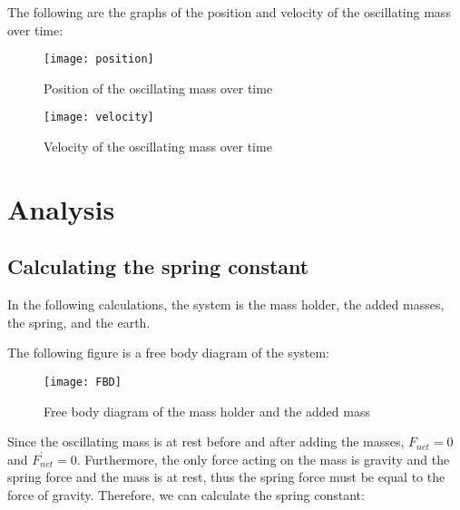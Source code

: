 \documentclass[titlepage]{article}
\begin{document}
            The following are the graphs of the position and velocity of the oscillating mass over time:
            
            \begin{minipage}{.5\textwidth}
                \begin{figure}[H]
                    \centering
                    \texttt{[image: position]}
                    \caption{Position of the oscillating mass over time}
                    \label{fig:position}
                \end{figure}
            \end{minipage}%
            \begin{minipage}{.5\textwidth}
                \begin{figure}[H]
                    \centering
                    \texttt{[image: velocity]}
                    \caption{Velocity of the oscillating mass over time}
                    \label{fig:velocity}
                \end{figure}
            \end{minipage}
    
    
    \section{Analysis}\label{sec:analysis}
        
        \subsection{Calculating the spring constant}\label{subsec:calculating-the-spring-constant}
            
            In the following calculations, the system is the mass holder, the added masses, the spring, and the earth.
            
            The following figure is a free body diagram of the system:
            \begin{figure}[H]
                \centering
                \texttt{[image: FBD]}
                \caption{Free body diagram of the mass holder and the added mass}
                \label{fig:FBD}
            \end{figure}
            
            Since the oscillating mass is at rest before and after adding the masses, $F_{net}^{\text{}} = 0$ and $F_{net}^{\text{'}} = 0$.
            Furthermore, the only force acting on the mass is gravity and the spring force and the mass is at rest, thus the spring force must be equal to the force of gravity.
            Therefore, we can calculate the spring constant:
            
\end{document}
